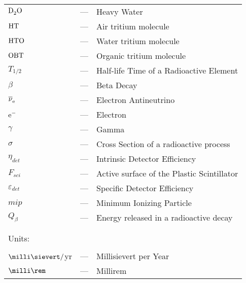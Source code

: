 \begin{longtable}{p{25mm} c p{120mm} }
$\ce{D_{2}O}$ & --- & Heavy Water\\
$\ce{HT}$ & --- & Air tritium molecule\\
$\ce{HTO}$ & --- & Water tritium molecule\\
$\ce{OBT}$ & --- & Organic tritium molecule\\
$T_{1/2}$ & --- & Half-life Time of a Radioactive Element\\
$\beta$ & --- & Beta Decay\\
$\ce{\overline{\nu}_e}$ & --- & Electron Antineutrino\\
$\ce{e^-}$ & --- & Electron\\
$\gamma$ & --- & Gamma\\
$\sigma$ & --- & Cross Section of a radioactive process\\
$\eta_{det}$ & --- & Intrinsic Detector Efficiency\\
$F_{sci}$ & --- & Active surface of the Plastic Scintillator\\
$\varepsilon_{det}$ & --- & Specific Detector Efficiency\\
$mip$ & --- & Minimum Ionizing Particle\\
$Q_\beta$ & --- & Energy released in a radioactive decay\\

\\
\\

\multicolumn{3}{l}{Units:}\\
\\
$\milli\sievert/$yr & --- & Millisievert per Year\\
$\milli\rem$ & --- & Millirem\\


\end{longtable}
